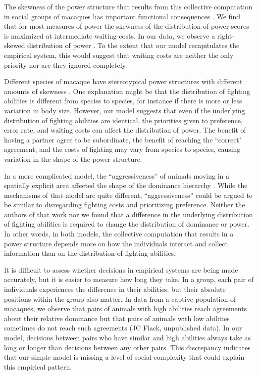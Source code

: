 \documentclass{article}
\begin{document}
The skewness of the power structure that results from this collective computation in social groups of macaques has important functional consequences \cite{Flack:2004oq,Flack:2006fk}. We find that for most measures of power the skewness of the distribution of power scores is maximized at intermediate waiting costs.  In our data, we observe a right-skewed distribution of power \cite{Brush:2013fk,Flack:2006uq}.  To the extent that our model recapitulates the empirical system, this would suggest that waiting costs are neither the only priority nor are they ignored completely.

Different species of macaque have stereotypical power structures with different amounts of skewness \cite{Flack:2004oq,Preuschoft:2004ly,Waal:1985fk}.  One explanation might be that the distribution of fighting abilities is different from species to species, for instance if there is more or less variation in body size.  However, our model suggests that even if the underlying distribution of fighting abilities are identical, the priorities given to preference, error rate, and waiting costs can affect the distribution of power.  The benefit of having a partner agree to be subordinate, the benefit of reaching the ``correct" agreement, and the costs of fighting may vary from species to species, causing variation in the shape of the power structure.

In a more complicated model, the ``aggressiveness'' of animals moving in a spatially explicit area affected the shape of the dominance hierarchy \cite{Hemelrijk:2011fk}.  While the mechanisms of that model are quite different, ``aggressiveness'' could be argued to be similar to disregarding fighting costs and prioritizing preference.  Neither the authors of that work nor we found that a difference in the underlying distribution of fighting abilities is required to change the distribution of dominance or power.  In other words, in both models, the collective computation that results in a power structure depends more on how the individuals interact and collect information than on the distribution of fighting abilities. 

It is difficult to assess whether decisions in empirical systems are being made accurately, but it is easier to measure how long they take.  In a group, each pair of individuals experiences the difference in their abilities, but their absolute positions within the group also matter.  In data from a captive population of macaques, we observe that pairs of animals with high abilities reach agreements about their relative dominance but that pairs of animals with low abilities sometimes do not reach such agreements (JC Flack, unpublished data).  In our model, decisions between pairs who have similar and high abilities always  take as long or longer than decisions between any other pairs.  This discrepancy indicates that our simple model is missing a level of social complexity that could explain this empirical pattern.  
\end{document}
